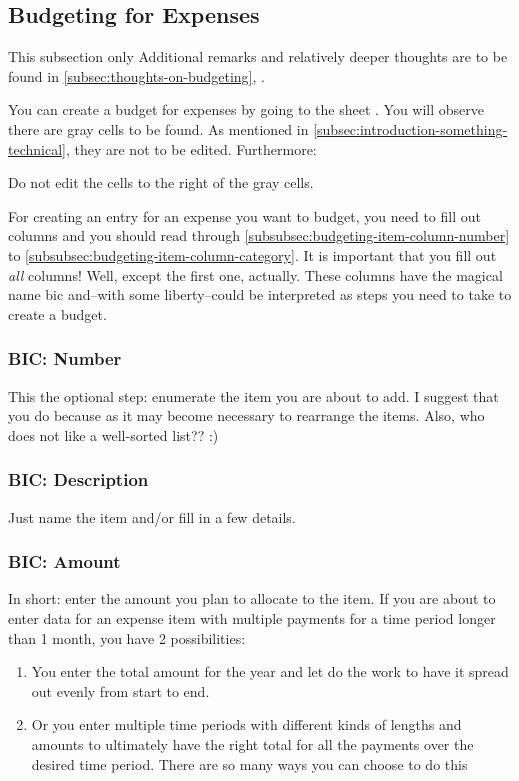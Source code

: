 \subsection{Budgeting for Expenses}
\label{subsec:budgeting-expenses}

This subsection only 
Additional remarks and relatively deeper thoughts are to be found in \autoref{subsec:thoughts-on-budgeting}, .

You can create a budget for expenses by going to the sheet .
You will observe there are gray cells to be found.
As mentioned in \autoref{subsec:introduction-something-technical}, they are not to be edited.
Furthermore:
\begin{specialnote}
	Do not edit the cells to the right of the gray cells.
\end{specialnote}

For creating an entry for an expense you want to budget, you need to fill out columns and you should read through \autoref{subsubsec:budgeting-item-column-number} to \autoref{subsubsec:budgeting-item-column-category}.
It is important that you fill out \emph{all} columns!
Well, except the first one, actually.
These columns have the magical name \ac{bic} and--with some liberty--could be interpreted as steps you need to take to create a budget.

\subsubsection{BIC: Number}
\label{subsubsec:budgeting-item-column-number}

This the optional step: enumerate the item you are about to add.
I suggest that you do because as it may become necessary to rearrange the items.
Also, who does not like a well-sorted list?? :)

\subsubsection{BIC: Description}
\label{subsubsec:budgeting-item-column-description}

Just name the item and/or fill in a few details.

\subsubsection{BIC: Amount}
\label{subsubsec:budgeting-item-column-amount}

In short: enter the amount you plan to allocate to the item.
If you are about to enter data for an expense item with multiple payments for a time period longer than 1 month, you have 2 possibilities:
\begin{enumerate}
	\item You enter the total amount for the year and let \tfn do the work to have it spread out evenly from start to end.
	\item Or you enter multiple time periods with different kinds of lengths and amounts to ultimately have the right total for all the payments over the desired time period.
	There are so many ways you can choose to do this
\end{enumerate}

